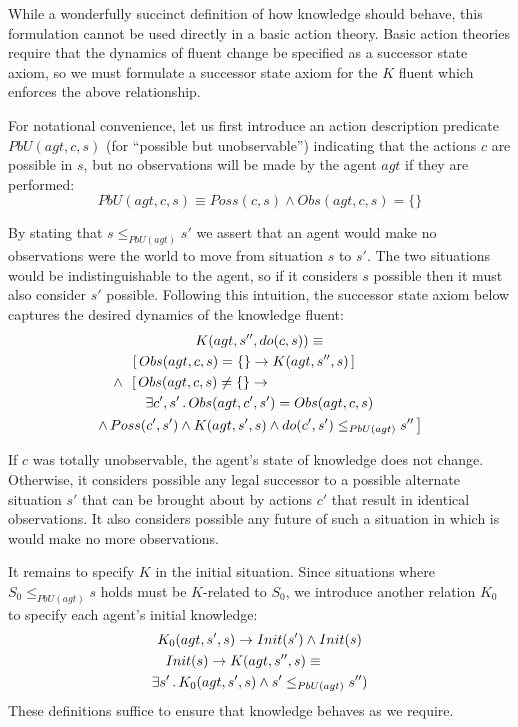 \documentclass{ifaamas-submission}
\begin{document}
While a wonderfully succinct definition of how knowledge should behave,
this formulation cannot be used directly in a basic action theory.
Basic action theories require that the dynamics of fluent change be
specified as a successor state axiom, so we must formulate a successor
state axiom for the $K$ fluent which enforces the above relationship.

For notational convenience, let us first introduce an action description
predicate $PbU(agt,c,s)$ (for {}``possible but unobservable'')
indicating that the actions $c$ are possible in $s$, but no observations
will be made by the agent $agt$ if they are performed:\begin{equation}
PbU(agt,c,s)\equiv
Poss(c,s)\wedge Obs(agt,c,s)=\{\}\label{eq:PbU_defn}\end{equation}


By stating that $s\leq_{PbU(agt)}s'$ we assert that an agent would
make no observations were the world to move from situation $s$ to
$s'$. The two situations would be indistinguishable to the agent,
so if it considers $s$ possible then it must also consider $s'$
possible. Following this intuition, the successor state axiom below
captures the desired dynamics of the knowledge fluent:\begin{multline}
K(agt,s'',do(c,s))\equiv\\
\shoveleft{\,\,\,\,\,\,\,\,\,\,\left[\, Obs(agt,c,s)=\{\}\rightarrow K(agt,s'',s)\,\right]}\\
\shoveleft{\,\,\wedge\,\,\,\left[\, Obs(agt,c,s)\neq\{\}\rightarrow\right.}\\
\exists c',s'\,.\, Obs(agt,c',s')=Obs(agt,c,s)\\
\left.\wedge\, Poss(c',s')\wedge K(agt,s',s)\wedge do(c',s')\leq_{PbU(agt)}s''\,\right]\label{eqn:new_k_ssa}\end{multline}
 

If $c$ was totally unobservable, the agent's state of knowledge does
not change. Otherwise, it considers possible any legal successor to
a possible alternate situation $s'$ that can be brought about by
actions $c'$ that result in identical observations. It also considers
possible any future of such a situation in which is would make no
more observations.

It remains to specify $K$ in the initial situation. Since situations
where $S_{0}\leq_{PbU(agt)}s$ holds must be $K$-related to $S_{0}$,
we introduce another relation $K_{0}$ to specify each agent's initial
knowledge: \begin{multline}
K_{0}(agt,s',s)\rightarrow Init(s')\wedge Init(s)\\
\shoveleft{Init(s)\rightarrow K(agt,s'',s)\equiv}\\
\exists s'\,.\, K_{0}(agt,s',s)\wedge s'\leq_{PbU(agt)}s'')\label{eqn:new_k_s0}\end{multline}
 These definitions suffice to ensure that knowledge behaves as we
require.
\end{document}
